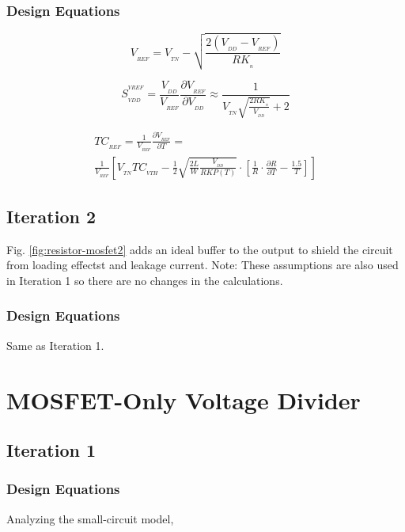 \documentclass[conference]{IEEEtran}
\begin{document}
\subsubsection{Design Equations} 
\begin{equation}
  \label{r_ref}
  V_{_{REF}} = V_{_{TN}} - \sqrt{\frac{2(V_{_{DD}}-V_{_{REF}})}{RK_{_n}}}
\end{equation}

\begin{equation}
  \label{r_sensitivity}
  S_{_{VDD}}^{^{V{REF}}} = \frac{V_{_{DD}}}{V_{_{REF}}}\frac{\partial{V_{_{REF}}}}{\partial{V_{_{DD}}}} \approx \frac{1}{V_{_{TN}}\sqrt{\frac{2RK_{_n}}{V_{_{DD}}}}+2}
\end{equation}

    \begin{multline}
      \label{r_tc}
      TC_{_{REF}} = \frac{1}{V_{_{REF}}}\frac{\partial{V_{_{REF}}}}{\partial{T}} =\\\frac{1}{V_{_{REF}}}\left[V_{_{TN}}TC_{_{VTH}}-\frac{1}{2}\sqrt{\frac{2L}{W}\frac{V_{_{DD}}}{RKP(T)}}{\cdot}\left[\frac{1}{R}{\cdot}\frac{{\partial}R}{{\partial}T}-\frac{1.5}{T}\right]\right]
    \end{multline}

\subsection{Iteration 2}
Fig. \ref{fig:resistor-mosfet2} adds an ideal buffer to the output to shield the circuit from loading effectst and leakage current.  Note: These assumptions are also used in Iteration 1 so there are no changes in the calculations.
\subsubsection{Design Equations}
Same as Iteration 1.

\section{MOSFET-Only Voltage Divider}
\subsection{Iteration 1}
\subsubsection{Design Equations}
Analyzing the small-circuit model, 
\end{document}
